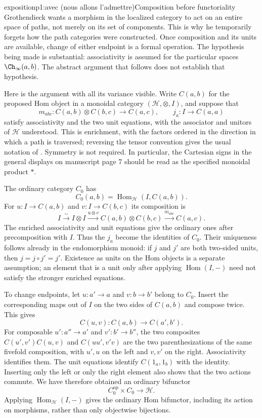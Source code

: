 \begin{dcomment}{exposition}{p1:avec (nous allons l'admettre)}{Composition before functoriality}
Grothendieck wants a morphism in the localized category to act on an entire space of paths, not merely on its set of components. This is why he temporarily forgets how the path categories were constructed. Once composition and its units are available, change of either endpoint is a formal operation. The hypothesis being made is substantial: associativity is assumed for the particular spaces $\Ch_\infty(a,b)$. The abstract argument that follows does not establish that hypothesis.

Here is the argument with all its variance visible. Write $C(a,b)$ for the proposed Hom object in a monoidal category $(\mathcal H,\otimes,I)$, and suppose that
\[
 m_{abc}:C(a,b)\otimes C(b,c)\longrightarrow C(a,c),
 \qquad j_a:I\longrightarrow C(a,a)
\]
satisfy associativity and the two unit equations, with the associator and unitors of $\mathcal H$ understood. This is enrichment, with the factors ordered in the direction in which a path is traversed; reversing the tensor convention gives the usual notation of \citet[\S\S1.1--1.3]{Kelly1982}. Symmetry is not required. In particular, the Cartesian signs in the general displays on manuscript page 7 should be read as the specified monoidal product $*$.

The ordinary category $C_0$ has
\[
 C_0(a,b)=\operatorname{Hom}_{\mathcal H}(I,C(a,b)).
\]
For $u:I\to C(a,b)$ and $v:I\to C(b,c)$ its composition is
\[
 I\xrightarrow{\sim}I\otimes I
   \xrightarrow{u\otimes v}C(a,b)\otimes C(b,c)
   \xrightarrow{m_{abc}}C(a,c).
\]
The enriched associativity and unit equations give the ordinary ones after precomposition with $I$. Thus the $j_a$ become the identities of $C_0$. Their uniqueness follows already in the endomorphism monoid: if $j$ and $j'$ are both two-sided units, then $j=j\circ j'=j'$. Existence as units on the Hom objects is a separate assumption; an element that is a unit only after applying $\operatorname{Hom}(I,-)$ need not satisfy the stronger enriched equations.

To change endpoints, let $u:a'\to a$ and $v:b\to b'$ belong to $C_0$. Insert the corresponding maps out of $I$ on the two sides of $C(a,b)$ and compose twice. This gives
\[
 C(u,v):C(a,b)\longrightarrow C(a',b').
\]
For composable $u':a''\to a'$ and $v':b'\to b''$, the two composites $C(u',v')C(u,v)$ and $C(uu',v'v)$ are the two parenthesizations of the same fivefold composition, with $u',u$ on the left and $v,v'$ on the right. Associativity identifies them. The unit equations identify $C(1_a,1_b)$ with the identity. Inserting only the left or only the right element also shows that the two actions commute. We have therefore obtained an ordinary bifunctor
\[
 C_0^{\mathrm{op}}\times C_0\longrightarrow\mathcal H.
\]
Applying $\operatorname{Hom}_{\mathcal H}(I,-)$ gives the ordinary Hom bifunctor, including its action on morphisms, rather than only objectwise bijections.


\end{dcomment}
